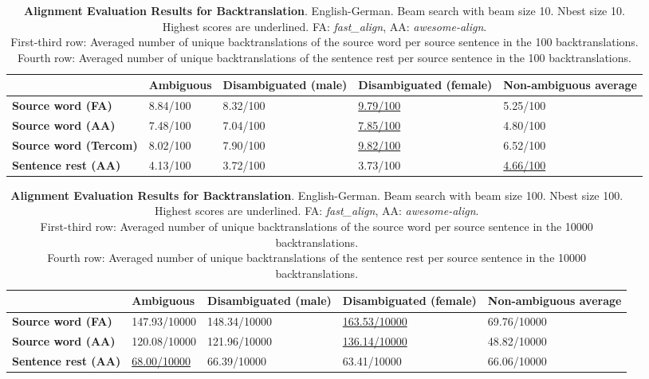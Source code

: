 \begin{table} 
    \label{tab:alignment_backtranslation_10}
    \begin{tabularx}{\linewidth}{|X|XXXX|}
        \hline
         & \textbf{Ambiguous} & \textbf{Disambiguated (male)} & \textbf{Disambiguated (female)} & \textbf{Non-ambiguous average} \\ \hline
         \textbf{Source word (FA)} & 8.84/100 & 8.32/100 & \underline{9.79/100} & 5.25/100 \\ 
         \textbf{Source word (AA)} & 7.48/100 & 7.04/100 & \underline{7.85/100} & 4.80/100 \\ 
         \textbf{Source word (Tercom)} & 8.02/100 & 7.90/100 & \underline{9.82/100} & 6.52/100 \\ \hline
         \textbf{Sentence rest (AA)} & 4.13/100 & 3.72/100 & 3.73/100 & \underline{4.66/100} \\ \hline
    \end{tabularx}
    \caption{\textbf{Alignment Evaluation Results for Backtranslation}. English-German. Beam search with beam size 10. Nbest size 10. Highest scores are underlined. FA: \textit{fast\_align}, AA: \textit{awesome-align}. \\ First-third row: Averaged number of unique backtranslations of the source word per source sentence in the 100 backtranslations. \\ Fourth row: Averaged number of unique backtranslations of the sentence rest per source sentence in the 100 backtranslations.}
\end{table}

\begin{table} 
    \label{tab:alignment_backtranslation_100}
    \begin{tabularx}{\linewidth}{|X|XXXX|}
        \hline
         & \textbf{Ambiguous} & \textbf{Disambiguated (male)} & \textbf{Disambiguated (female)} & \textbf{Non-ambiguous average} \\ \hline
         \textbf{Source word (FA)} & 147.93/10000 & 148.34/10000 & \underline{163.53/10000} & 69.76/10000 \\ 
         \textbf{Source word (AA)} & 120.08/10000 & 121.96/10000 & \underline{136.14/10000} & 48.82/10000 \\ \hline 
         \textbf{Sentence rest (AA)} & \underline{68.00/10000} & 66.39/10000 & 63.41/10000 & 66.06/10000 \\ \hline
    \end{tabularx}
    \caption{\textbf{Alignment Evaluation Results for Backtranslation}. English-German. Beam search with beam size 100. Nbest size 100. Highest scores are underlined. FA: \textit{fast\_align}, AA: \textit{awesome-align}. \\ First-third row: Averaged number of unique backtranslations of the source word per source sentence in the 10000 backtranslations. \\ Fourth row: Averaged number of unique backtranslations of the sentence rest per source sentence in the 10000 backtranslations.}
\end{table}



